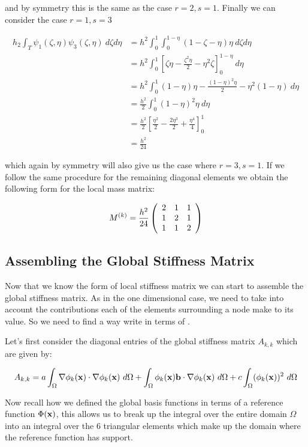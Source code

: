 and by symmetry this is the same as the case $r = 2, s = 1$. Finally we can consider the case
$r = 1, s = 3$

\begin{align*}
    h_2\int_T\psi_1(\zeta, \eta)\psi_3(\zeta, \eta)\ d\zeta d\eta
    &= h^2\int_0^1\int_0^{1-\eta}(1 - \zeta - \eta)\eta\ d\zeta d\eta \\
    &= h^2\int_0^1\left[\zeta\eta - \frac{\zeta^2\eta}{2} - \eta^2\zeta\right]_0^{1-\eta}\ d\eta \\
    &= h^2\int_0^1(1-\eta)\eta - \frac{(1 - \eta)^2\eta}{2} - \eta^2(1 - \eta)\ d\eta \\
    &= \frac{h^2}{2}\int_0^1(1 - \eta)^2\eta \ d\eta \\
    &= \frac{h^2}{2}\left[\frac{\eta^2}{2} - \frac{2\eta^3}{2} + \frac{\eta^4}{4}\right]_0^1 \\
    &= \frac{h^2}{24}
\end{align*}

which again by symmetry will also give us the case where $r = 3, s = 1$. If we
follow the same procedure for the remaining diagonal elements we obtain the
following form for the local mass matrix:

\begin{equation}\label{eq:twod-local-mass}
    M^{(k)} =
    \frac{h^2}{24}\left(\begin{array}{c c c}
         2 &  1 &  1 \\
         1 &  2 &  1 \\
         1 &  1 &  2
      \end{array}\right)
\end{equation}

\subsection{Assembling the Global Stiffness Matrix}

Now that we know the form of local stiffness matrix
 we can start to assemble the global stiffness
matrix. As in the one dimensional case, we need to take into account the
contributions each of the elements surrounding a node make to its value. So we
need to find a way write  in terms of
.

Let's first consider the diagonal entries of the global stiffness matrix
$A_{k,k}$ which are given by:

\begin{align*}
A_{k,k} =
    a\int_{\Omega}\nabla\phi_k(\mathbf{x}) \cdot \nabla\phi_k(\mathbf{x})\ d\Omega
    + \int_{\Omega}\phi_k(\mathbf{x})\mathbf{b} \cdot \nabla\phi_k(\mathbf{x})\ d\Omega
    + c\int_{\Omega}(\phi_k(\mathbf{x}))^2\ d\Omega
\end{align*}

Now recall how we defined the global basis functions in terms of a reference
function $\Phi(\mathbf{x})$, this allows us to break up the integral over the entire
domain $\Omega$ into an integral over the 6 triangular elements which make up
the domain where the reference function has support.
